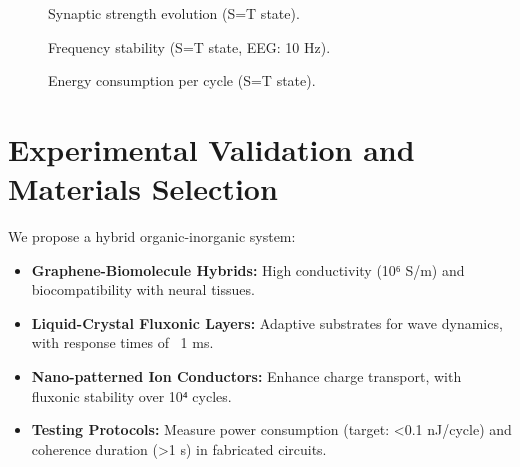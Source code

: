 \documentclass{article}
\begin{document}
\begin{figure}[ht]
    \centering
    \caption{Synaptic strength evolution (S=T state).}
    \label{fig:syn_strength}
\end{figure}

\begin{figure}[ht]
    \centering
    \caption{Frequency stability (S=T state, EEG: 10 Hz).}
    \label{fig:freq}
\end{figure}

\begin{figure}[ht]
    \centering
    \caption{Energy consumption per cycle (S=T state).}
    \label{fig:energy}
\end{figure}

\section{Experimental Validation and Materials Selection}
We propose a hybrid organic-inorganic system:
\begin{itemize}
    \item \textbf{Graphene-Biomolecule Hybrids:} High conductivity (10⁶ S/m) and biocompatibility with neural tissues.
    \item \textbf{Liquid-Crystal Fluxonic Layers:} Adaptive substrates for wave dynamics, with response times of ~1 ms.
    \item \textbf{Nano-patterned Ion Conductors:} Enhance charge transport, with fluxonic stability over 10⁴ cycles.
    \item \textbf{Testing Protocols:} Measure power consumption (target: <0.1 nJ/cycle) and coherence duration (>1 s) in fabricated circuits.
\end{itemize}
\end{document}
